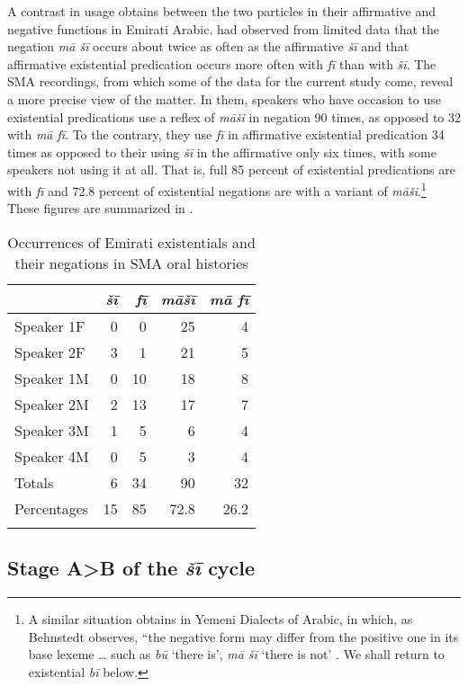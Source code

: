 \documentclass[output=paper]{langsci/langscibook}
\begin{document}
A contrast in usage obtains between the two particles in their affirmative and negative functions in Emirati Arabic. \citet[528]{wilmsen2020a} had observed from limited data that the negation \textit{mā šī} occurs about twice as often as the affirmative \textit{šī} and that affirmative existential predication occurs more often with \textit{fī} than with \textit{šī}. The SMA recordings, from which some of the data for the current study come, reveal a more precise view of the matter. In them, speakers who have occasion to use existential predications use a reflex of \textit{māši} in negation 90 times, as opposed to 32 with \textit{mā fī}. To the contrary, they use \textit{fī} in affirmative existential predication 34 times as opposed to their using \textit{šī} in the affirmative only six times, with some speakers not using it at all. That is, full 85 percent of existential predications are with \textit{fī} and 72.8 percent of existential negations are with a variant of \textit{māši}.\footnote{A similar situation obtains in Yemeni Dialects of Arabic, in which, as Behnstedt observes, “the negative form may differ from the positive one in its base lexeme … such as \textit{bū} ‘there is’, \textit{mā šī} ‘there is not’ \citeyearpar[345]{behnstedt2016a}. We shall return to existential \textit{bī} below.} These figures are summarized in .

\begin{table}[!h]
	\centering
	\caption{Occurrences of Emirati existentials and their negations in SMA oral histories}
	\label{tab:WiAR-2}
\begin{tabularx}{\textwidth}{Qrrrr}
\lsptoprule
\textit{} & \textit{šī} & \textit{fī} & \textit{māšī} & \textit{mā fī} \\ \midrule
Speaker 1F & 0 & 0 & 25 & 4 \\
Speaker 2F & 3 & 1 & 21 & 5 \\
Speaker 1M & 0 & 10 & 18 & 8 \\
Speaker 2M & 2 & 13 & 17 & 7 \\
Speaker 3M & 1 & 5 & 6 & 4 \\
Speaker 4M & 0 & 5 & 3 & 4 \\ \midrule
Totals & 6 & 34 & 90 & 32 \\ \midrule
Percentages & 15 & 85 & 72.8 & 26.2 \\ \lspbottomrule   
\end{tabularx}
\end{table}

\subsection{Stage A>B of the \textit{šī} cycle} \label{s:WiAR-3.1}
\end{document}
